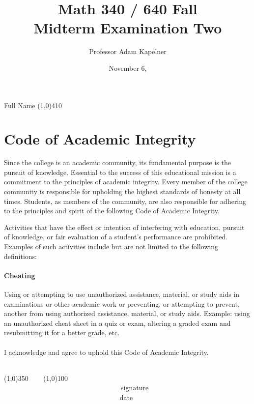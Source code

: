 \documentclass[12pt]{article}
\title{Math 340 / 640 Fall \the\year{} \\ Midterm Examination Two}
\author{Professor Adam Kapelner}
\date{November 6, \the\year{}}
\begin{document}
\maketitle

\noindent Full Name \line(1,0){410}

\thispagestyle{empty}

\section*{Code of Academic Integrity}

\footnotesize
Since the college is an academic community, its fundamental purpose is the pursuit of knowledge. Essential to the success of this educational mission is a commitment to the principles of academic integrity. Every member of the college community is responsible for upholding the highest standards of honesty at all times. Students, as members of the community, are also responsible for adhering to the principles and spirit of the following Code of Academic Integrity.

Activities that have the effect or intention of interfering with education, pursuit of knowledge, or fair evaluation of a student's performance are prohibited. Examples of such activities include but are not limited to the following definitions:

\paragraph{Cheating} Using or attempting to use unauthorized assistance, material, or study aids in examinations or other academic work or preventing, or attempting to prevent, another from using authorized assistance, material, or study aids. Example: using an unauthorized cheat sheet in a quiz or exam, altering a graded exam and resubmitting it for a better grade, etc.\\
\\
\noindent I acknowledge and agree to uphold this Code of Academic Integrity. \\~\\

\begin{center}
\line(1,0){350} ~~~ \line(1,0){100}\\
~~~~~~~~~~~~~~~~~~~~~~~~~~~~~~~~~~signature~~~~~~~~~~~~~~~~~~~~~~~~~~~~~~~~~~~~~~~~~~~~~~~~~~~~~~~~~~~~~~ date
\end{center}

\normalsize
\end{document}
